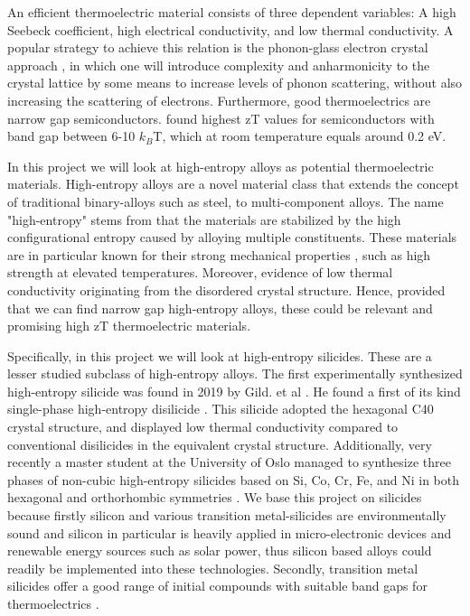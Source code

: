 \documentclass[UKenglish]{ifimaster}  %
\begin{document}
An efficient thermoelectric material consists of three dependent variables: A high Seebeck coefficient, high electrical conductivity, and low thermal conductivity. A popular strategy to achieve this relation is the phonon-glass electron crystal approach \cite{SnyderG.Jeffrey2008Ctm}, in which one will introduce complexity and anharmonicity to the crystal lattice by some means to increase levels of phonon scattering, without also increasing the scattering of electrons. Furthermore, good thermoelectrics are narrow gap semiconductors. \cite{TE_gap} found highest zT values for semiconductors with band gap between 6-10 $k_B$T, which at room temperature equals around 0.2 eV.   

In this project we will look at high-entropy alloys as potential thermoelectric materials. High-entropy alloys are a novel material class that extends the concept of traditional binary-alloys such as steel, to multi-component alloys. The name "high-entropy" stems from that the materials are stabilized by the high configurational entropy caused by alloying multiple constituents. These materials are in particular known for their strong mechanical properties \cite{hea}, such as high strength at elevated temperatures. Moreover, evidence of low thermal conductivity originating from the disordered crystal structure. Hence, provided that we can find narrow gap high-entropy alloys, these could be relevant and promising high zT thermoelectric materials.   

Specifically, in this project we will look at high-entropy silicides. These are a lesser studied subclass of high-entropy alloys. The first experimentally synthesized high-entropy silicide was found in 2019 by Gild. et al \cite{GILD2019337}. He found a first of its kind single-phase high-entropy disilicide . This silicide adopted the hexagonal C40 crystal structure, and displayed low thermal conductivity compared to conventional disilicides in the equivalent crystal structure. Additionally, very recently a master  student at the University of Oslo managed to synthesize three phases of non-cubic high-entropy silicides based on Si, Co, Cr, Fe, and Ni in both hexagonal and orthorhombic symmetries \cite{mari}. We base this project on silicides because firstly silicon and various transition metal-silicides are environmentally sound and silicon in particular is heavily applied in micro-electronic devices and renewable energy sources such as solar power, thus silicon based alloys could readily be implemented into these technologies. Secondly, transition metal silicides offer a good range of initial compounds with suitable band gaps for thermoelectrics \cite{silicde}.   
\end{document}
